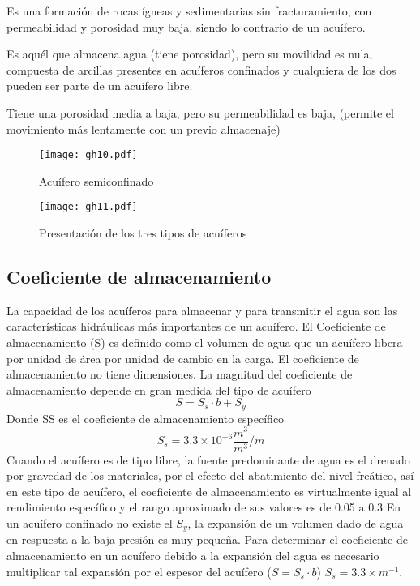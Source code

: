 \begin{definition}[Acuífugo]
    Es una formación de rocas ígneas y sedimentarias sin fracturamiento, con permeabilidad y porosidad muy baja, siendo lo contrario de un acuífero.
\end{definition}
\begin{definition}[Acuicludo]
    Es aquél que almacena agua (tiene porosidad), pero su movilidad es nula, compuesta de arcillas presentes en acuíferos confinados y cualquiera de los dos pueden ser parte de un acuífero libre.
\end{definition}
\begin{definition}[Acuitardo]
    Tiene una porosidad media a baja, pero su permeabilidad es baja, (permite el movimiento más lentamente con un previo almacenaje)
\end{definition}
\begin{figure}[h!]
\centering
  \texttt{[image: gh10.pdf]}
  \caption{Acuífero semiconfinado}
  \label{gh10}
\end{figure}
\begin{figure}[h!]
\centering
  \texttt{[image: gh11.pdf]}
  \caption{Presentación de los tres tipos de acuíferos}
  \label{gh11}
\end{figure}
\subsection{Coeficiente de almacenamiento}
La capacidad de los acuíferos para almacenar y para transmitir el agua son las características hidráulicas más importantes de un acuífero.
El Coeficiente de almacenamiento (S) es definido como el volumen de agua que un acuífero libera por unidad de área por unidad de cambio en la carga. El coeficiente de almacenamiento no tiene dimensiones. La magnitud del coeficiente de almacenamiento depende en gran medida del tipo de acuífero
\begin{equation}
    S = S_s \cdot b + S_y
\end{equation}
Donde SS es el coeficiente de almacenamiento específico 
\begin{equation}
    S_s = 3.3 \times 10^{- 6}\frac{m^3}{m^3} / m
\end{equation}    
Cuando el acuífero es de tipo libre, la fuente predominante de agua es el drenado por gravedad de los materiales, por el efecto del abatimiento del nivel freático, así en este tipo de acuífero, el coeficiente de almacenamiento es virtualmente igual al rendimiento específico y el rango aproximado de sus valores es de 0.05 a 0.3
En un acuífero confinado no existe el $S_y$, la expansión de un volumen dado de agua en respuesta a la baja presión es muy pequeña. Para determinar el coeficiente de almacenamiento en un acuífero debido a la expansión del agua es necesario multiplicar tal expansión por el espesor del acuífero ($S=S_s\cdot b$) $S_s=3.3\times  m^{-1}$.

